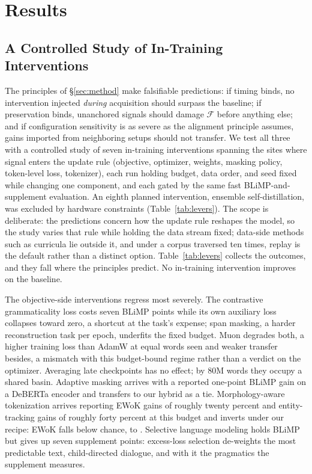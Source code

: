 \section{Results}
\label{sec:results}


\subsection{A Controlled Study of In-Training Interventions}
\label{sec:search}



The principles of \S\ref{sec:method} make falsifiable predictions: if timing
binds, no intervention injected \emph{during} acquisition should surpass the
baseline; if preservation binds,
unanchored signals should damage $\mathcal{F}$ before anything else; and if
configuration sensitivity is as severe as the alignment principle assumes,
gains imported from neighboring setups should not transfer. We test all three
with a controlled study of seven in-training interventions spanning the
sites where signal enters the update rule (objective, optimizer, weights,
masking policy, token-level loss, tokenizer), each run holding budget, data
order, and seed fixed while changing one component, and each gated by the
same
fast BLiMP-and-supplement evaluation. An eighth planned intervention,
ensemble
self-distillation, was excluded by hardware constraints
(Table~\ref{tab:levers}). The scope is deliberate: the predictions
concern how the update rule reshapes the model, so the study varies that
rule while holding the data stream fixed; data-side methods such as
curricula lie outside it, and under a corpus traversed ten times, replay
is the default rather than a distinct option.
Table~\ref{tab:levers}
collects the outcomes, and they fall where the principles predict. No
in-training intervention improves on the baseline.

The objective-side interventions regress most severely. The contrastive
grammaticality loss
costs seven BLiMP points while its own auxiliary loss collapses toward zero,
a shortcut at the task's expense; span masking, a harder
reconstruction task per epoch, underfits the fixed budget. Muon degrades
both, a higher training loss than AdamW at equal words seen and weaker
transfer besides, a mismatch with this budget-bound regime rather than a
verdict on the optimizer. Averaging
late checkpoints has no effect; by 80M words they occupy a shared basin. Adaptive
masking arrives with a reported one-point BLiMP gain on a DeBERTa encoder
\citep{edman2025mask} and transfers to our hybrid as a tie. Morphology-aware
tokenization arrives reporting EWoK gains of roughly twenty percent and
entity-tracking gains of roughly forty percent at this budget
\citep{bolucu2025morpheme}
and inverts under our recipe: EWoK falls below chance, to \rLevMorphEwok{}. Selective language
modeling \citep{lin2024rho,mindermann2022prioritized} holds BLiMP but gives
up seven supplement points: excess-loss selection de-weights the most
predictable text, child-directed dialogue, and with it the pragmatics the
supplement measures.

